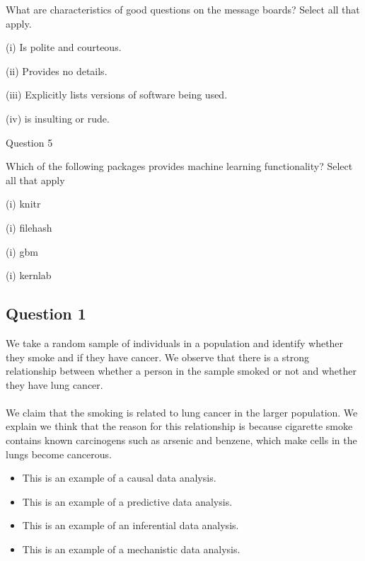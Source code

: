 \documentclass[12pt]{article}
\begin{document}
What are characteristics of good questions on the message boards? Select all that apply.
 

\item[(i)] Is polite and courteous. 

\item[(ii)] Provides no details. 

\item[(iii)] Explicitly lists versions of software being used. 

\item[(iv)] is insulting or rude. 

Question 5
 
Which of the following packages provides machine learning functionality? Select all that apply
 

\item[(i)] knitr 

\item[(i)] filehash 

\item[(i)] gbm 

\item[(i)] kernlab 



\subsection*{Question 1}
We take a random sample of individuals in a population and identify whether they smoke and if they have cancer. We observe that there is a strong relationship between whether a person in the sample smoked or not and whether they have lung cancer. 
\\
\\
We claim that the smoking is related to lung cancer in the larger population. We explain we think that the reason for this relationship is because cigarette smoke contains known carcinogens such as arsenic and benzene, which make cells in the lungs become cancerous.
\begin{itemize}
\item This is an example of a causal data analysis.
\item This is an example of a predictive data analysis.
\item This is an example of an inferential data analysis.
\item This is an example of a mechanistic data analysis.
\end{itemize}
\newpage
\end{document}
